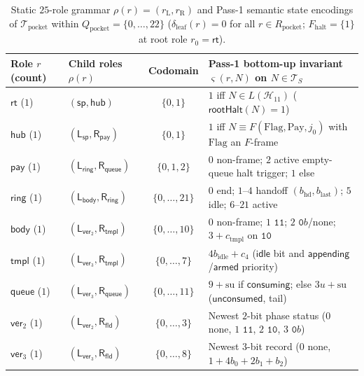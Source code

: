 \documentclass[11pt,reqno]{amsart}
\numberwithin{equation}{section}
\theoremstyle{plain}
\theoremstyle{definition}
\theoremstyle{remark}
\newcommand{\TS}{\mathcal{T}_S}
\begin{document}
\begin{table}[htbp]
\centering
\caption{Static $25$-role grammar $\rho(r) = (r_{\mathrm{L}}, r_{\mathrm{R}})$ and Pass-1 semantic state encodings of $\mathcal{T}_{\mathrm{pocket}}$ within $Q_{\mathrm{pocket}} = \{0,\dots,22\}$ ($\delta_{\mathrm{leaf}}(r) = 0$ for all $r \in R_{\mathrm{pocket}}$; $F_{\mathrm{halt}} = \{1\}$ at root role $r_0 = \mathsf{rt}$).}\label{tab:pocket-roles}
\small
\begin{tabular}{@{}llcl@{}}
\toprule
Role $r$ (count) & Child roles $\rho(r)$ & Codomain & Pass-1 bottom-up invariant $\varsigma(r, N)$ on $N \in \TS$ \\
\midrule
$\mathsf{rt}$ ($1$) & $(\mathsf{sp}, \mathsf{hub})$ & $\{0,1\}$ & $1$ iff $N \in L(\mathcal{H}_{11})$ ($\mathsf{rootHalt}(N) = 1$) \\
$\mathsf{hub}$ ($1$) & $(\mathsf{L}_{\mathsf{sp}}, \mathsf{R}_{\mathsf{pay}})$ & $\{0,1\}$ & $1$ iff $N \equiv F(\mathrm{Flag}, \mathrm{Pay}, j_0)$ with $\mathrm{Flag}$ an $F$-frame \\
$\mathsf{pay}$ ($1$) & $(\mathsf{L}_{\mathsf{ring}}, \mathsf{R}_{\mathsf{queue}})$ & $\{0,1,2\}$ & $0$ non-frame; $2$ active empty-queue halt trigger; $1$ else \\
$\mathsf{ring}$ ($1$) & $(\mathsf{L}_{\mathsf{body}}, \mathsf{R}_{\mathsf{ring}})$ & $\{0,\dots,21\}$ & $0$ end; $1\text{--}4$ handoff $(b_{\mathrm{hd}}, b_{\mathrm{last}})$; $5$ idle; $6\text{--}21$ active \\
$\mathsf{body}$ ($1$) & $(\mathsf{L}_{\mathsf{ver}_2}, \mathsf{R}_{\mathsf{tmpl}})$ & $\{0,\dots,10\}$ & $0$ non-frame; $1$ $\mathtt{11}$; $2$ $\mathtt{0}b$/none; $3 + c_{\mathrm{tmpl}}$ on $\mathtt{10}$ \\
$\mathsf{tmpl}$ ($1$) & $(\mathsf{L}_{\mathsf{ver}_3}, \mathsf{R}_{\mathsf{tmpl}})$ & $\{0,\dots,7\}$ & $4 b_{\mathrm{idle}} + c_4$ ($\mathsf{idle}$ bit and $\mathsf{appending}$/$\mathsf{armed}$ priority) \\
$\mathsf{queue}$ ($1$) & $(\mathsf{L}_{\mathsf{ver}_3}, \mathsf{R}_{\mathsf{queue}})$ & $\{0,\dots,11\}$ & $9 + \mathrm{su}$ if $\mathsf{consuming}$; else $3 u + \mathrm{su}$ ($\mathsf{unconsumed}$, tail) \\
$\mathsf{ver}_2$ ($1$) & $(\mathsf{L}_{\mathsf{ver}_2}, \mathsf{R}_{\mathsf{fld}})$ & $\{0,\dots,3\}$ & Newest $2$-bit phase status ($0$ none, $1$ $\mathtt{11}$, $2$ $\mathtt{10}$, $3$ $\mathtt{0}b$) \\
$\mathsf{ver}_3$ ($1$) & $(\mathsf{L}_{\mathsf{ver}_3}, \mathsf{R}_{\mathsf{fld}})$ & $\{0,\dots,8\}$ & Newest $3$-bit record ($0$ none, $1 + 4 b_0 + 2 b_1 + b_2$) \\

\end{tabular}
\end{table}
\end{document}
